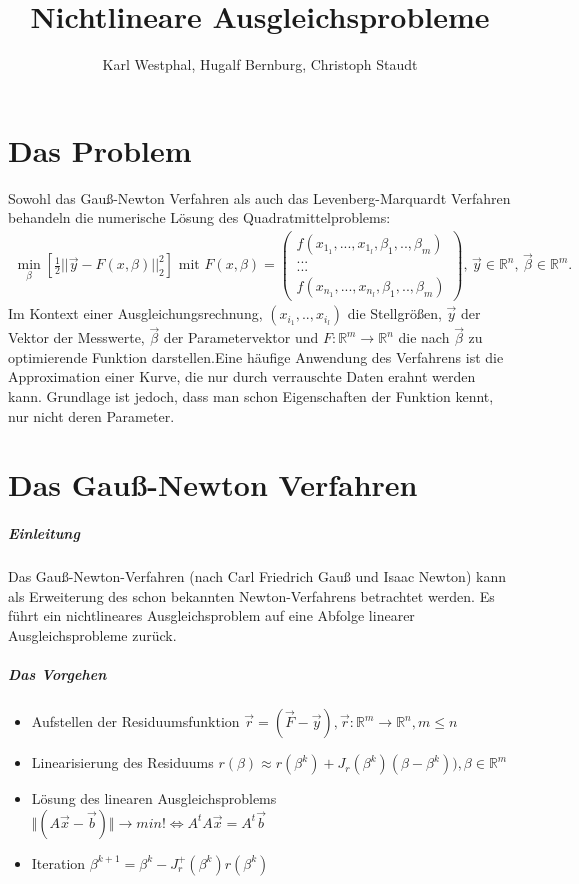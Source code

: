 \documentclass[a4paper,10pt]{scrartcl}
\title{Nichtlineare Ausgleichsprobleme}
\author{Karl Westphal, Hugalf Bernburg, Christoph Staudt}
\begin{document}
\maketitle
\section{Das Problem}
Sowohl das Gauß-Newton Verfahren als auch das Levenberg-Marquardt Verfahren behandeln die numerische Lösung des Quadratmittelproblems:
\begin{align*}
\min_{\beta} \left [\frac{1}{2}||\vec{y}-F(x,\beta)||_2^2 \right]\text{ mit }
F(x,\beta)=
\begin{pmatrix}
f(x_{1_1},...,x_{1_l},\beta_1,..,\beta_m)\\
...\\
...\\
f(x_{n_1},...,x_{n_l},\beta_1,..,\beta_m)
\end{pmatrix}
, \, \vec{y} \in \mathbb{R}^n , \, \vec{\beta} \in \mathbb{R}^m.
\end{align*}
Im Kontext einer Ausgleichungsrechnung, $(x_{i_1},..,x_{i_l})$ die Stellgrößen, $\vec{y}$ der Vektor der Messwerte, $\vec{\beta}$ der Parametervektor und
 $F:\mathbb{R}^m\rightarrow \mathbb{R}^n$ die nach
  $\vec{\beta}$ zu optimierende Funktion darstellen.Eine häufige Anwendung des Verfahrens ist die Approximation einer Kurve, die nur durch verrauschte Daten erahnt werden kann. Grundlage ist jedoch, dass man schon Eigenschaften der Funktion kennt, nur nicht deren Parameter.
\section{Das Gauß-Newton Verfahren}
\subparagraph{Einleitung}
Das Gauß-Newton-Verfahren (nach Carl Friedrich Gauß und Isaac Newton) kann als Erweiterung des schon bekannten Newton-Verfahrens betrachtet werden. Es führt ein nichtlineares Ausgleichsproblem auf eine Abfolge linearer Ausgleichsprobleme zurück.
\subparagraph{Das Vorgehen}
\begin{itemize}
\item Aufstellen der Residuumsfunktion 	\tab $\vec{r}=(\vec{F}-\vec{y}),\vec{r}:\mathbb{R}^m\rightarrow \mathbb{R}^n ,m \leq n$
\item Linearisierung des Residuums  \tab $r(\beta)\approx r(\beta^k)+J_r(\beta^k)(\beta-\beta^k)), \beta \in \mathbb{R}^m$
\item Lösung des linearen Ausgleichsproblems \tab $\Vert(A\vec{x}-\vec{b})\Vert\rightarrow min! \Leftrightarrow A^tA\vec{x}=A^t\vec{b}$
\item Iteration \tab $\beta^{k+1}=\beta^k-J_r^+(\beta^k)r(\beta^k)$
\end{itemize}
\end{document}
